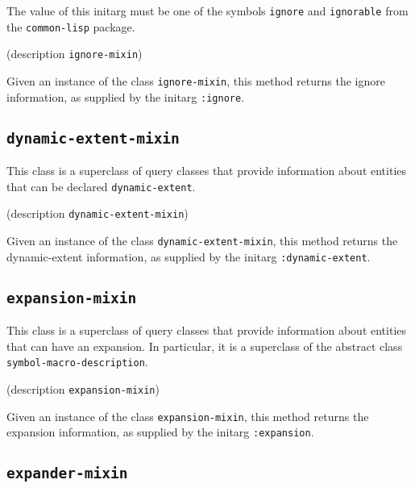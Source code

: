 The value of this initarg must be one of the symbols \texttt{ignore}
and \texttt{ignorable} from the \texttt{common-lisp} package.

{\footnotesize
{} {(description {\tt ignore-mixin})}
}

Given an instance of the class \texttt{ignore-mixin}, this method
returns the ignore information, as supplied by the initarg
\texttt{:ignore}.

\subsection{\texttt{dynamic-extent-mixin}}
\label{sec-dynamic-extent-mixin}

{\footnotesize
{}
}

This class is a superclass of query classes that provide information
about entities that can be declared \texttt{dynamic-extent}.

{\footnotesize
{}
}

{\footnotesize
{} {(description {\tt dynamic-extent-mixin})}
}

Given an instance of the class \texttt{dynamic-extent-mixin}, this method
returns the dynamic-extent information, as supplied by the initarg
\texttt{:dynamic-extent}.

\subsection{\texttt{expansion-mixin}}
\label{sec-expansion-mixin}

{\footnotesize
{}
}

This class is a superclass of query classes that provide information
about entities that can have an expansion.  In particular, it is a
superclass of the abstract class \texttt{symbol-macro-description}.

{\footnotesize
{}
}

{\footnotesize
{} {(description {\tt expansion-mixin})}
}

Given an instance of the class \texttt{expansion-mixin}, this method
returns the expansion information, as supplied by the initarg
\texttt{:expansion}.

\subsection{\texttt{expander-mixin}}
\label{sec-expander-mixin}

